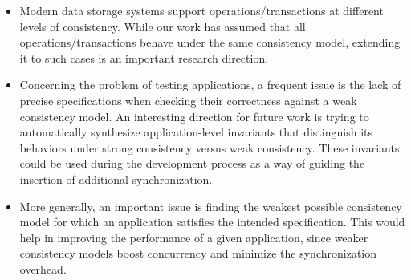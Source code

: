 \begin{itemize}
%

\item Modern data storage systems support operations/transactions at different levels of consistency. While our work has assumed that all operations/transactions behave under the same consistency model, extending it to such cases is an important research direction.

\item Concerning the problem of testing applications, a frequent issue is the lack of precise specifications when checking their correctness against a weak consistency model. An interesting direction for future work is trying to automatically synthesize application-level invariants that distinguish its behaviors under strong consistency versus weak consistency. These invariants could be used during the development process as a way of guiding the insertion of additional synchronization. 


\item More generally, an important issue is finding the weakest possible consistency model for which an application satisfies the intended specification. This would help in improving the performance of a given application, since weaker consistency models boost concurrency and minimize the synchronization overhead.



\end{itemize}
